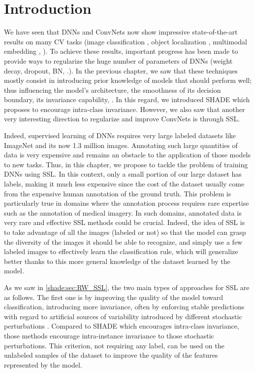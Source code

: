 
\section{Introduction}


We have seen that \acp{DNN} and \acp{ConvNet} now show impressive state-of-the-art results on many \ac{CV} tasks (image classification \citep{he2016deep}, object localization \citep{dai2016r}, multimodal embedding \citep{Martin2018,Carvalho2018}, \etc). To achieve these results, important progress has been made to provide ways to regularize the huge number of parameters of \acp{DNN} (\eg weight decay, dropout, \ac{BN}, \etc.). In the previous chapter, we saw that these techniques mostly consist in introducing prior knowledge of models that should perform well; thus influencing the model's architecture, the smoothness of its decision boundary, its invariance capability, \etc. In this regard, we introduced \ac{SHADE} which proposes to encourage intra-class invariance. However, we also saw that another very interesting direction to regularize and improve \acp{ConvNet} is through \acf{SSL}.

Indeed, supervised learning of \acp{DNN} requires very large labeled datasets like ImageNet and its now 1.3 million images. Annotating such large quantities of data is very expensive and remains an obstacle to the application of those models to new tasks. Thus, in this chapter, we propose to tackle the problem of training \acp{DNN} using \acf{SSL}. In this context, only a small portion of our large dataset has labels, making it much less expensive since the cost of the dataset usually come from the expensive human annotation of the ground truth. This problem is particularly true in domains where the annotation process requires rare expertise such as the annotation of medical imagery. In such domains, annotated data is very rare and effective \ac{SSL} methods could be crucial. Indeed, the idea of \ac{SSL} is to take advantage of all the images (labeled or not) so that the model can grasp the diversity of the images it should be able to recognize, and simply use a few labeled images to effectively learn the classification rule, which will generalize better thanks to this more general knowledge of the dataset learned by the model.

As we saw in \autoref{shade:sec:RW_SSL}, the two main types of approaches for \ac{SSL} are as follows. The first one is by improving the quality of the model toward classification, introducing more invariance, often by enforcing stable predictions with regard to artificial sources of variability introduced by different stochastic perturbations \citep{Sajjadi2016,Laine2016,Tarvainen2017}. Compared to \ac{SHADE} which encourages intra-class invariance, those methods encourage intra-instance invariance to those stochastic perturbations. This criterion, not requiring any label, can be used on the unlabeled samples of the dataset to improve the quality of the features represented by the model.


